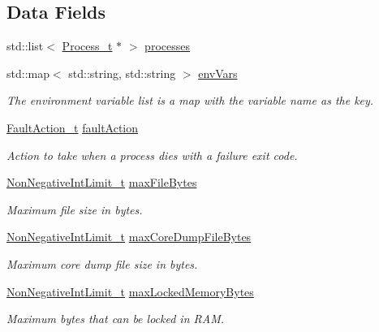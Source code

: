 \subsection*{Data Fields}
\begin{DoxyCompactItemize}
\item 
std\+::list$<$ \hyperlink{struct_process__t}{Process\+\_\+t} $\ast$ $>$ \hyperlink{struct_process_env__t_a1482465d6fc9690b268d14b2f0599310}{processes}
\item 
std\+::map$<$ std\+::string, std\+::string $>$ \hyperlink{struct_process_env__t_af429a708c25492bb5edf27cf72a56c30}{env\+Vars}
\begin{DoxyCompactList}\small\item\em The environment variable list is a map with the variable name as the key. \end{DoxyCompactList}\item 
\hyperlink{class_fault_action__t}{Fault\+Action\+\_\+t} \hyperlink{struct_process_env__t_ae05732c371b2e01522ff40a792c11416}{fault\+Action}
\begin{DoxyCompactList}\small\item\em Action to take when a process dies with a failure exit code. \end{DoxyCompactList}\item 
\hyperlink{class_non_negative_int_limit__t}{Non\+Negative\+Int\+Limit\+\_\+t} \hyperlink{struct_process_env__t_abc8419c85e89660a1b45f4db9e1aa1a8}{max\+File\+Bytes}
\begin{DoxyCompactList}\small\item\em Maximum file size in bytes. \end{DoxyCompactList}\item 
\hyperlink{class_non_negative_int_limit__t}{Non\+Negative\+Int\+Limit\+\_\+t} \hyperlink{struct_process_env__t_a96d84e8665f1ade501edfa2a71d15461}{max\+Core\+Dump\+File\+Bytes}
\begin{DoxyCompactList}\small\item\em Maximum core dump file size in bytes. \end{DoxyCompactList}\item 
\hyperlink{class_non_negative_int_limit__t}{Non\+Negative\+Int\+Limit\+\_\+t} \hyperlink{struct_process_env__t_a360a673bc3137fc006bfc9dfa56316ab}{max\+Locked\+Memory\+Bytes}
\begin{DoxyCompactList}\small\item\em Maximum bytes that can be locked in R\+AM. \end{DoxyCompactList}\item 

\end{DoxyCompactItemize}

